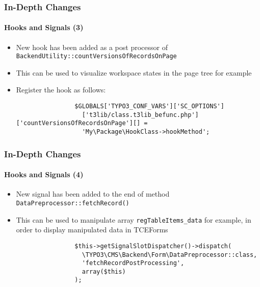 
\begin{frame}[fragile]
	\frametitle{In-Depth Changes}
	\framesubtitle{Hooks and Signals (3)}

	\begin{itemize}

		\item New hook has been added as a post processor of
			\small
				\texttt{BackendUtility::countVersionsOfRecordsOnPage}
			\normalsize

		\item This can be used to visualize workspace states in the page tree for example
		\item Register the hook as follows:

			\begin{lstlisting}
				$GLOBALS['TYPO3_CONF_VARS']['SC_OPTIONS']
				  ['t3lib/class.t3lib_befunc.php']['countVersionsOfRecordsOnPage'][] =
				  'My\Package\HookClass->hookMethod';
			\end{lstlisting}

	\end{itemize}

\end{frame}


\begin{frame}[fragile]
	\frametitle{In-Depth Changes}
	\framesubtitle{Hooks and Signals (4)}

	\begin{itemize}

		\item New signal has been added to the end of method \texttt{DataPreprocessor::fetchRecord()}
		\item This can be used to manipulate array \texttt{regTableItems\_data} for example,
			in order to display manipulated data in TCEForms

			\begin{lstlisting}
				$this->getSignalSlotDispatcher()->dispatch(
				  \TYPO3\CMS\Backend\Form\DataPreprocessor::class,
				  'fetchRecordPostProcessing',
				  array($this)
				);
			\end{lstlisting}

	\end{itemize}

\end{frame}

